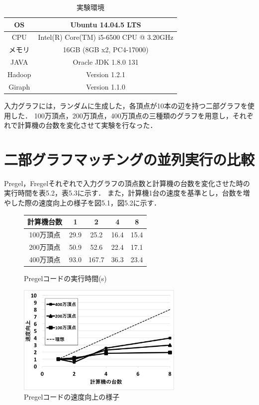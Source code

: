 \documentclass[12pt]{ujreport}
\begin{document}
\begin{table}[htb]
  \caption{実験環境}
  \centering
  \begin{tabular}{|c||c|} \hline
    OS & Ubuntu 14.04.5 LTS\\ \hline
    CPU & Intel(R) Core(TM) i5-6500 CPU @ 3.20GHz\\ \hline
    メモリ & 16GB (8GB x2, PC4-17000)\\ \hline
    JAVA & Oracle JDK 1.8.0 131\\ \hline
    Hadoop & Version 1.2.1\\ \hline
    Giraph & Version 1.1.0\\ \hline
  \end{tabular}
\end{table}

入力グラフには，ランダムに生成した，各頂点が10本の辺を持つ二部グラフを使用した．
100万頂点，200万頂点，400万頂点の三種類のグラフを用意し，それぞれで計算機の台数を変化させて実験を行なった．

\section{二部グラフマッチングの並列実行の比較}
Pregel，Fregelそれぞれで入力グラフの頂点数と計算機の台数を変化させた時の実行時間を表5.2，表5.3に示す．
また，計算機1台の速度を基準とし，台数を増やした際の速度向上の様子を図5.1，図5.2に示す．

\begin{figure}[ht]
  \begin{minipage}{0.5\textwidth}
    \begin{center}
      \makeatletter
      \def\@captype{table}
      \makeatother
      \begin{tabular}{|c||c|c|c|c|}\hline
        計算機台数 & 1 & 2 & 4 & 8\\ \hline
        100万頂点 & 29.9 & 25.2 & 16.4 & 15.4\\ \hline
        200万頂点 & 50.9 & 52.6 & 22.4 & 17.1\\ \hline
        400万頂点 & 93.0 & 167.7 & 36.3 & 23.4\\ \hline
      \end{tabular}
      \caption{Pregelコードの実行時間(s)}
    \end{center}
  \end{minipage}
  \begin{minipage}{0.7\textwidth}
    \begin{center}
      \includegraphics[width = 8cm]{kisuuPregel.png}
      \caption{Pregelコードの速度向上の様子}
    \end{center}
  \end{minipage}
\end{figure}
\end{document}
